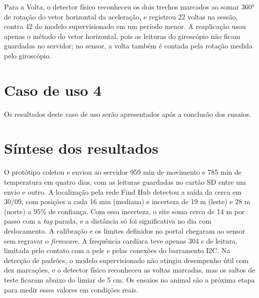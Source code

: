 Para a Volta, o detector físico reconheceu os dois trechos marcados ao somar 360° de rotação do vetor horizontal da aceleração, e registrou 22 voltas na sessão, contra 42 do modelo supervisionado em um período menor. A reaplicação usou apenas o método do vetor horizontal, pois as leituras do giroscópio não ficam guardadas no servidor; no sensor, a volta também é contada pela rotação medida pelo giroscópio.

\section{Caso de uso 4}
\label{sec:res-uc4}

Os resultados deste caso de uso serão apresentados após a conclusão dos ensaios.

\section{Síntese dos resultados}
\label{sec:res-sintese}

O protótipo coletou e enviou ao servidor 959 min de movimento e 785 min de temperatura em quatro dias, com as leituras guardadas no cartão SD entre um envio e outro. A localização pela rede Find Hub detectou a saída da cerca em 30/09, com posições a cada 16 min (mediana) e incerteza de 19 m (leste) e 28 m (norte) a 95\% de confiança. Com essa incerteza, o site soma cerca de 14 m por passo com a \textit{tag} parada, e a distância só foi significativa no dia com deslocamento. A calibração e os limites definidos no portal chegaram ao sensor sem regravar o \textit{firmware}. A frequência cardíaca teve apenas 304 s de leitura, limitada pelo contato com a pele e pelas conexões do barramento I2C. Na detecção de padrões, o modelo supervisionado não atingiu desempenho útil com dez marcações, e o detector físico reconheceu as voltas marcadas, mas os saltos de teste ficaram abaixo do limiar de 5 cm. Os ensaios no animal são a próxima etapa para medir esses valores em condições reais.

